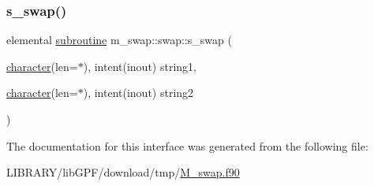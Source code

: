 \subsubsection{\texorpdfstring{s\+\_\+swap()}{s\_swap()}}
{\footnotesize\ttfamily elemental \hyperlink{M__stopwatch_83_8txt_acfbcff50169d691ff02d4a123ed70482}{subroutine} m\+\_\+swap\+::swap\+::s\+\_\+swap (\begin{DoxyParamCaption}\item[{\hyperlink{option__stopwatch_83_8txt_abd4b21fbbd175834027b5224bfe97e66}{character}(len=$\ast$), intent(inout)}]{string1,  }\item[{\hyperlink{option__stopwatch_83_8txt_abd4b21fbbd175834027b5224bfe97e66}{character}(len=$\ast$), intent(inout)}]{string2 }\end{DoxyParamCaption})\hspace{0.3cm}{\ttfamily [private]}}



The documentation for this interface was generated from the following file\+:\begin{DoxyCompactItemize}
\item 
L\+I\+B\+R\+A\+R\+Y/lib\+G\+P\+F/download/tmp/\hyperlink{M__swap_8f90}{M\+\_\+swap.\+f90}\end{DoxyCompactItemize}
